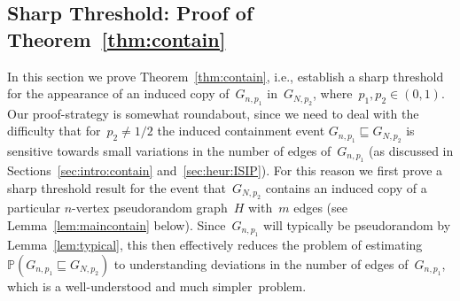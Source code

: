 \documentclass{article}
\renewcommand{\Pr}{\mathbb{P}}
\newcommand{\isub}{\sqsubseteq}
\newcommand{\refT}[1]{Theorem~\ref{#1}}
\newcommand{\refL}[1]{Lemma~\ref{#1}}
\begin{document}
\subsection{Sharp Threshold: Proof of \refT{thm:contain}}\label{sec:proofcontain}
In this section we prove \refT{thm:contain}, i.e., establish a sharp threshold for the appearance of an induced copy of~$G_{n,p_1}$ in~$G_{N,p_2}$, where~$p_1,p_2 \in (0,1)$. 
Our proof-strategy is somewhat roundabout,
since we need to deal with the difficulty that for~$p_2 \neq 1/2$ the induced containment event $G_{n,p_1}\isub G_{N,p_2}$ is sensitive towards small variations in the number of edges of~$G_{n,p_1}$ (as discussed in Sections~\ref{sec:intro:contain} and~\ref{sec:heur:ISIP}).
For this reason we first prove a sharp threshold result for the event that~$G_{N,p_2}$ contains an induced copy of a particular $n$-vertex pseudorandom graph~$H$ with~$m$ edges (see \refL{lem:maincontain} below). 
Since~$G_{n,p_1}$ will typically be pseudorandom by \refL{lem:typical}, 
this then effectively reduces the problem of estimating ${\Pr(G_{n,p_1}\isub G_{N,p_2})}$ 
to understanding deviations in the number of edges of~$G_{n,p_1}$, 
which is a well-understood and much simpler~problem. 
\end{document}
